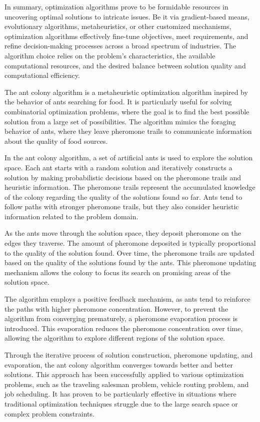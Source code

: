 In summary, optimization algorithms prove to be formidable resources in uncovering optimal solutions to intricate issues. Be it via gradient-based means, evolutionary algorithms, metaheuristics, or other customized mechanisms, optimization algorithms effectively fine-tune objectives, meet requirements, and refine decision-making processes across a broad spectrum of industries. The algorithm choice relies on the problem's characteristics, the available computational resources, and the desired balance between solution quality and computational efficiency.

The ant colony algorithm is a metaheuristic optimization algorithm inspired by the behavior of ants searching for food. It is particularly useful for solving combinatorial optimization problems, where the goal is to find the best possible solution from a large set of possibilities. The algorithm mimics the foraging behavior of ants, where they leave pheromone trails to communicate information about the quality of food sources.

In the ant colony algorithm, a set of artificial ants is used to explore the solution space. Each ant starts with a random solution and iteratively constructs a solution by making probabilistic decisions based on the pheromone trails and heuristic information. The pheromone trails represent the accumulated knowledge of the colony regarding the quality of the solutions found so far. Ants tend to follow paths with stronger pheromone trails, but they also consider heuristic information related to the problem domain.

As the ants move through the solution space, they deposit pheromone on the edges they traverse. The amount of pheromone deposited is typically proportional to the quality of the solution found. Over time, the pheromone trails are updated based on the quality of the solutions found by the ants. This pheromone updating mechanism allows the colony to focus its search on promising areas of the solution space.

The algorithm employs a positive feedback mechanism, as ants tend to reinforce the paths with higher pheromone concentration. However, to prevent the algorithm from converging prematurely, a pheromone evaporation process is introduced. This evaporation reduces the pheromone concentration over time, allowing the algorithm to explore different regions of the solution space.

Through the iterative process of solution construction, pheromone updating, and evaporation, the ant colony algorithm converges towards better and better solutions. This approach has been successfully applied to various optimization problems, such as the traveling salesman problem, vehicle routing problem, and job scheduling. It has proven to be particularly effective in situations where traditional optimization techniques struggle due to the large search space or complex problem constraints.

